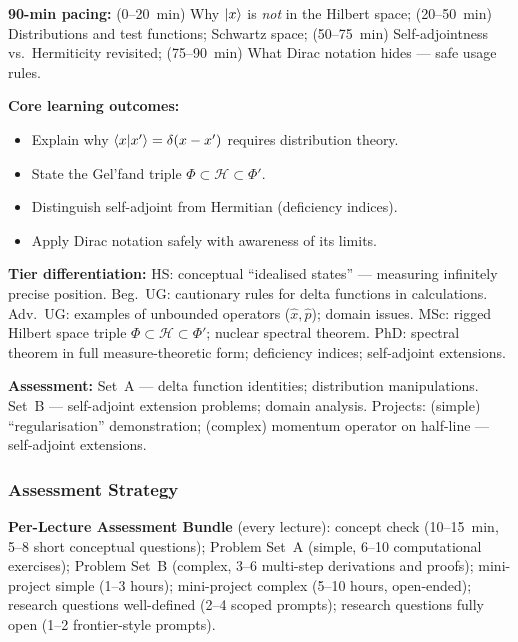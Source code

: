\documentclass[11pt,a4paper]{article}
\begin{document}
\medskip
\begin{tcolorbox}[modulebox, title={Module~I.2 / L12: Rigged Hilbert Spaces \& Mathematical Foundations}]
\textbf{90-min pacing:} (0--20~min) Why $\ket{x}$ is \emph{not} in the Hilbert space;
(20--50~min) Distributions and test functions; Schwartz space;
(50--75~min) Self-adjointness vs.\ Hermiticity revisited;
(75--90~min) What Dirac notation hides --- safe usage rules.

\medskip\textbf{Core learning outcomes:}
\begin{itemize}[leftmargin=1.4em,topsep=2pt,itemsep=1pt]
  \item Explain why $\braket{x|x'}=\delta(x-x')$ requires distribution theory.
  \item State the Gel'fand triple $\Phi\subset\mathcal{H}\subset\Phi'$.
  \item Distinguish self-adjoint from Hermitian (deficiency indices).
  \item Apply Dirac notation safely with awareness of its limits.
\end{itemize}

\medskip\textbf{Tier differentiation:}
HS: conceptual ``idealised states'' --- measuring infinitely precise position.
Beg.\ UG: cautionary rules for delta functions in calculations.
Adv.\ UG: examples of unbounded operators ($\hat{x},\hat{p}$); domain issues.
MSc: rigged Hilbert space triple $\Phi\subset\mathcal{H}\subset\Phi'$; nuclear spectral theorem.
PhD: spectral theorem in full measure-theoretic form; deficiency indices; self-adjoint extensions.

\medskip\textbf{Assessment:}
Set~A --- delta function identities; distribution manipulations.
Set~B --- self-adjoint extension problems; domain analysis.
Projects: (simple) ``regularisation'' demonstration; (complex) momentum operator on half-line --- self-adjoint extensions.
\end{tcolorbox}

\subsubsection*{Assessment Strategy}
\label{sec:braket-assessment}

\begin{tcolorbox}[highlightbox]
\textbf{Per-Lecture Assessment Bundle} (every lecture):
concept check (10--15~min, 5--8 short conceptual questions);
Problem Set~A (simple, 6--10 computational exercises);
Problem Set~B (complex, 3--6 multi-step derivations and proofs);
mini-project simple (1--3 hours);
mini-project complex (5--10 hours, open-ended);
research questions well-defined (2--4 scoped prompts);
research questions fully open (1--2 frontier-style prompts).
\end{tcolorbox}
\end{document}
